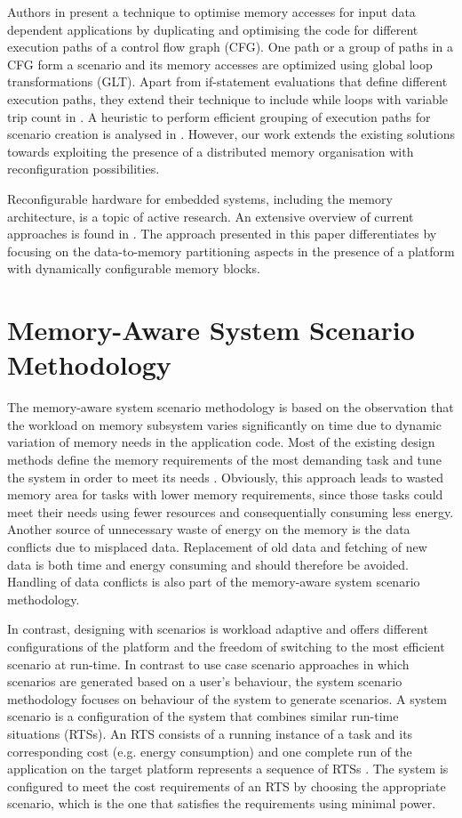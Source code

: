 \documentclass[a4paper,conference]{IEEEtran}
\begin{document}
Authors in \cite{Pal06} present a technique to optimise memory accesses for input data dependent applications by duplicating and optimising the code for different execution paths of a control flow graph (CFG). One path or a group of paths in a CFG form a scenario and its memory accesses are optimized using global loop transformations (GLT). Apart from if-statement evaluations that define different execution paths, they extend their technique to include while loops with variable trip count in \cite{Pal06b}. A heuristic to perform efficient grouping of execution paths for scenario creation is analysed in \cite{Pal07}. However, our work extends the existing solutions towards exploiting the presence of a distributed memory organisation with reconfiguration possibilities.

Reconfigurable hardware for embedded systems, including the memory architecture, is a topic of active research. An extensive overview of current approaches is found in \cite{Garcia}. The approach presented in this paper differentiates by focusing on the data-to-memory partitioning aspects in the presence of a platform with dynamically configurable memory blocks. 

\section{Memory-Aware System Scenario Methodology}
\label{sec:methodology}

The memory-aware system scenario methodology is based on the observation that the workload on memory subsystem varies significantly on time due to dynamic variation of memory needs in the application code. Most of the existing design methods define the memory requirements of the most demanding task and tune the system in order to meet its needs \cite{tcm}. Obviously, this approach leads to wasted memory area for tasks with lower memory requirements, since those tasks could meet their needs using fewer resources and consequentially consuming less energy. Another source of unnecessary waste of energy on the memory is the data conflicts due to misplaced data. Replacement of old data and fetching of new data is both time and energy consuming and should therefore be avoided. Handling of data conflicts is also part of the  memory-aware system scenario methodology.

In contrast, designing with scenarios is workload adaptive and offers different configurations of the platform and the freedom of switching to the most efficient scenario at run-time. In contrast to use case scenario approaches in which scenarios are generated based on a user's behaviour, the system scenario methodology focuses on behaviour of the system to generate scenarios. A system scenario is a configuration of the system that combines similar run-time situations (RTSs). An RTS consists of a running instance of a task and its corresponding cost (e.g. energy consumption) and one complete run of the application on the target platform represents a sequence of RTSs \cite{Elena2010}. The system is configured to meet the cost requirements of an RTS by choosing the appropriate scenario, which is the one that satisfies the requirements using minimal power.
\end{document}

